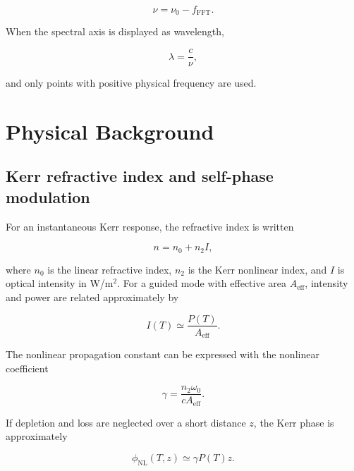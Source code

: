 \documentclass[11pt,a4paper]{article}
\newcommand{\FFT}{\mathrm{FFT}}
\begin{document}
\begin{equation}
\boxed{
\nu=\nu_0-f_{\FFT}.
}
\end{equation}

When the spectral axis is displayed as wavelength,

\begin{equation}
\lambda=\frac{c}{\nu},
\end{equation}

and only points with positive physical frequency are used.

\section{Physical Background}

\subsection{Kerr refractive index and self-phase modulation}

For an instantaneous Kerr response, the refractive index is written

\begin{equation}
 n=n_0+n_2 I,
\end{equation}

where $n_0$ is the linear refractive index, $n_2$ is the Kerr nonlinear index,
and $I$ is optical intensity in W/m$^2$. For a guided mode with effective area
$A_{\mathrm{eff}}$, intensity and power are related approximately by

\begin{equation}
 I(T)\simeq\frac{P(T)}{A_{\mathrm{eff}}}.
\end{equation}

The nonlinear propagation constant can be expressed with the nonlinear
coefficient

\begin{equation}
\boxed{
\gamma=\frac{n_2\omega_0}{cA_{\mathrm{eff}}}.
}
\end{equation}

If depletion and loss are neglected over a short distance $z$, the Kerr phase
is approximately

\begin{equation}
\phi_{\mathrm{NL}}(T,z)\simeq\gamma P(T)z.
\end{equation}
\end{document}
